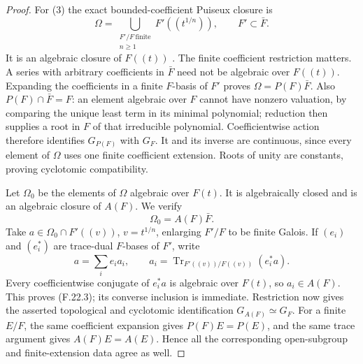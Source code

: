 \documentclass[11pt]{article}
\begin{document}
\begin{proof}
For (3) the exact bounded-coefficient Puiseux closure is
\[
 \Omega=\bigcup_{\substack{F'/F\ \mathrm{finite}\\n\ge1}}
                       F'((t^{1/n})),\qquad F'\subset\bar F.
                                                        \tag{F.22.2}
\]
It is an algebraic closure of \(F((t))\)
\citep[Proposition, p.~314]{FF_vanDenDriesRibenboim1984}.
The finite coefficient restriction matters. A series with
arbitrary coefficients in \(\bar F\) need not be
algebraic over \(F((t))\). Expanding the coefficients
in a finite \(F\)-basis of \(F'\) proves
\(\Omega=P(F)\bar F\). Also \(P(F)\cap\bar F=F\):
an element algebraic over \(F\) cannot have nonzero
valuation, by comparing the unique least term in its
minimal polynomial; reduction then supplies a root in
\(F\) of that irreducible polynomial. Coefficientwise
action therefore identifies \(G_{P(F)}\) with \(G_F\).
It and its inverse are continuous, since every element
of \(\Omega\) uses one finite coefficient extension.
Roots of unity are constants, proving cyclotomic compatibility.

Let \(\Omega_0\) be the elements of \(\Omega\)
algebraic over \(F(t)\). It is algebraically closed and
is an algebraic closure of \(A(F)\). We verify
\[
                         \Omega_0=A(F)\bar F.             \tag{F.22.3}
\]
Take \(a\in\Omega_0\cap F'((v))\),
\(v=t^{1/n}\), enlarging \(F'/F\) to be finite
Galois. If \((e_i)\) and \((e_i^*)\) are trace-dual
\(F\)-bases of \(F'\), write
\[
 a=\sum_i e_i a_i,\qquad
 a_i=\operatorname{Tr}_{F'((v))/F((v))}(e_i^*a).
\]
Every coefficientwise conjugate of \(e_i^*a\) is
algebraic over \(F(t)\), so \(a_i\in A(F)\).
This proves (F.22.3); its converse inclusion is immediate.
Restriction now gives the asserted topological and
cyclotomic identification \(G_{A(F)}\simeq G_F\).
For a finite \(E/F\), the same coefficient expansion
gives \(P(F)E=P(E)\), and the same trace argument gives
\(A(F)E=A(E)\). Hence all the corresponding open-subgroup
and finite-extension data agree as well.


\end{proof}
\end{document}
